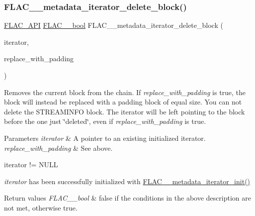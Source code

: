 \subsubsection{\texorpdfstring{F\+L\+A\+C\+\_\+\+\_\+metadata\+\_\+iterator\+\_\+delete\+\_\+block()}{FLAC\_\_metadata\_iterator\_delete\_block()}}
{\footnotesize\ttfamily \hyperlink{group__flac__export_ga56ca07df8a23310707732b1c0007d6f5}{F\+L\+A\+C\+\_\+\+A\+PI} \hyperlink{ordinals_8h_a95103469f1cbd78b8cf250194985b34e}{F\+L\+A\+C\+\_\+\+\_\+bool} F\+L\+A\+C\+\_\+\+\_\+metadata\+\_\+iterator\+\_\+delete\+\_\+block (\begin{DoxyParamCaption}\item[{\hyperlink{group__flac__metadata__level2_ga9f3e135a07cdef7e51597646aa7b89b2}{F\+L\+A\+C\+\_\+\+\_\+\+Metadata\+\_\+\+Iterator} $\ast$}]{iterator,  }\item[{\hyperlink{ordinals_8h_a95103469f1cbd78b8cf250194985b34e}{F\+L\+A\+C\+\_\+\+\_\+bool}}]{replace\+\_\+with\+\_\+padding }\end{DoxyParamCaption})}

Removes the current block from the chain. If {\itshape replace\+\_\+with\+\_\+padding} is {\ttfamily true}, the block will instead be replaced with a padding block of equal size. You can not delete the S\+T\+R\+E\+A\+M\+I\+N\+FO block. The iterator will be left pointing to the block before the one just \char`\"{}deleted\char`\"{}, even if {\itshape replace\+\_\+with\+\_\+padding} is {\ttfamily true}.


\begin{DoxyParams}{Parameters}
{\em iterator} & A pointer to an existing initialized iterator. \\
\hline
{\em replace\+\_\+with\+\_\+padding} & See above.  
\begin{DoxyCode}
iterator != NULL 
\end{DoxyCode}
 {\itshape iterator} has been successfully initialized with \hyperlink{group__flac__metadata__level2_ga4a5af69a1f19436b02f738eb8c97c959}{F\+L\+A\+C\+\_\+\+\_\+metadata\+\_\+iterator\+\_\+init()} \\
\hline
\end{DoxyParams}

\begin{DoxyRetVals}{Return values}
{\em F\+L\+A\+C\+\_\+\+\_\+bool} & {\ttfamily false} if the conditions in the above description are not met, otherwise {\ttfamily true}. \\
\hline
\end{DoxyRetVals}
\mbox{\label{group__flac__metadata__level2_ga4a2b00a4312d178a9f55c2e2f8b08904}} 
